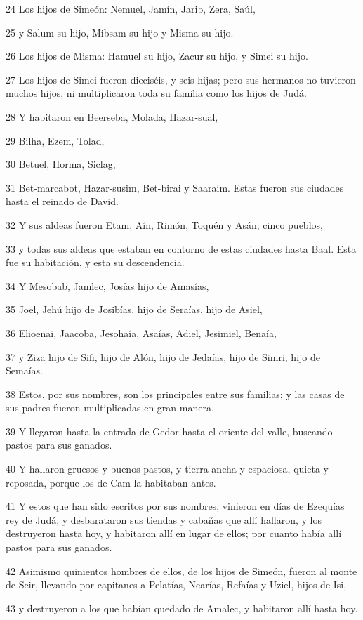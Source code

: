 \par 24 Los hijos de Simeón: Nemuel, Jamín, Jarib, Zera, Saúl,
\par 25 y Salum su hijo, Mibsam su hijo y Misma su hijo.
\par 26 Los hijos de Misma: Hamuel su hijo, Zacur su hijo, y Simei su hijo.
\par 27 Los hijos de Simei fueron dieciséis, y seis hijas; pero sus hermanos no tuvieron muchos hijos, ni multiplicaron toda su familia como los hijos de Judá.
\par 28 Y habitaron en Beerseba, Molada, Hazar-sual,
\par 29 Bilha, Ezem, Tolad,
\par 30 Betuel, Horma, Siclag,
\par 31 Bet-marcabot, Hazar-susim, Bet-birai y Saaraim. Estas fueron sus ciudades hasta el reinado de David.
\par 32 Y sus aldeas fueron Etam, Aín, Rimón, Toquén y Asán; cinco pueblos,
\par 33 y todas sus aldeas que estaban en contorno de estas ciudades hasta Baal. Esta fue su habitación, y esta su descendencia.
\par 34 Y Mesobab, Jamlec, Josías hijo de Amasías,
\par 35 Joel, Jehú hijo de Josibías, hijo de Seraías, hijo de Asiel,
\par 36 Elioenai, Jaacoba, Jesohaía, Asaías, Adiel, Jesimiel, Benaía,
\par 37 y Ziza hijo de Sifi, hijo de Alón, hijo de Jedaías, hijo de Simri, hijo de Semaías.
\par 38 Estos, por sus nombres, son los principales entre sus familias; y las casas de sus padres fueron multiplicadas en gran manera.
\par 39 Y llegaron hasta la entrada de Gedor hasta el oriente del valle, buscando pastos para sus ganados.
\par 40 Y hallaron gruesos y buenos pastos, y tierra ancha y espaciosa, quieta y reposada, porque los de Cam la habitaban antes.
\par 41 Y estos que han sido escritos por sus nombres, vinieron en días de Ezequías rey de Judá, y desbarataron sus tiendas y cabañas que allí hallaron, y los destruyeron hasta hoy, y habitaron allí en lugar de ellos; por cuanto había allí pastos para sus ganados.
\par 42 Asimismo quinientos hombres de ellos, de los hijos de Simeón, fueron al monte de Seir, llevando por capitanes a Pelatías, Nearías, Refaías y Uziel, hijos de Isi,
\par 43 y destruyeron a los que habían quedado de Amalec, y habitaron allí hasta hoy.


